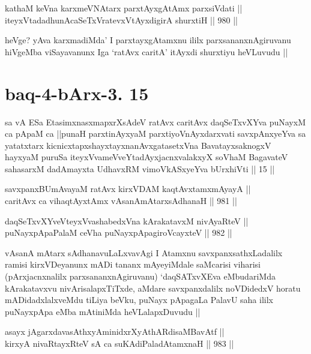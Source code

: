 \begin{shl}
kathaM keVna karxmeVNAtarx parxtAyxgAtAmx parxsiVdati || \\
iteyxVtadadhunA\s \s caSeTxVratevxVtAyxdigirA shurxtiH ||  980 ||  
\end{shl}

\begin{artha}
heVge? yAva karxmadiMda' I parxtayxgAtamxnu ililx parxsananxnAgiruvanu hiVgeMba viSayavanunx Iga `ratAvx caritA' itAyxdi shurxtiyu heVLuvudu ||
\end{artha}

\section*{baq-4-bArx-3. 15}

\begin{shl}
sa vA ESa EtasimxnasxmapxrXsAdeV ratAvx caritAvx daqSeTxvXYva puNayxM ca pApaM ca ||punaH parxtinAyxyaM parxtiyoVnAyxdarxvati savxpAnxyeYva sa yatatxtarx kicnicxtapxshayxtayxnanAvxgatasetxVna BavatayxsaknogxV hayxyaM puruSa iteyxVvameVveYtadAyxjacnxvalakxyX soV\s haM BagavateV sahasarxM dadAmayxta UdhavxRM vimoVkASxyeYva bUrxhiVti || 15 ||
\end{shl}


\begin{shl}
savxpanxBUmAvayaM ratAvx kirxVDAM kaqtAvx\s \s tamxmAyayA || \\
caritAvx ca vihaqtAyx\s \s tAmx vAsanAmAtarxsAdhanaH ||  981 ||  
\end{shl}
				
\begin{shl}
daqSeTxvXYveVteyxVvashabedxVna kArakatavxM nivAyaRteV || \\
puNayxpApaPalaM ceVha puNayxpApagiroVcayxteV ||  982 ||  
\end{shl}

\begin{artha}
vAsanA mAtarx sAdhanavuLaLxvavAgi I Atamxnu savxpanxsathxLadalilx ramisi kirxVDeyanunx mADi tananx mAyeyiMdale saMcarisi viharisi (pArxjacnxnalilx parxsananxnAgiruvanu) `daqSATxvXEva eMbudariMda kArakatavxvu nivArisalapxTiTxde, aMdare savxpanxdalilx noVDidedxV horatu mADidadxlalxveMdu tiLiya beVku, puNayx pApagaLa PalavU saha ililx puNayxpApa eMba mAtiniMda heVLalapxDuvudu ||
\end{artha}

\begin{shl}
asayx jAgarxdavasAthxyAminidxrXyAthARdisaMBavAtf || \\
kirxyA nivaRtayxRteV sA ca suKAdiPaladA\s \s tamxnaH ||  983 ||  
\end{shl}

